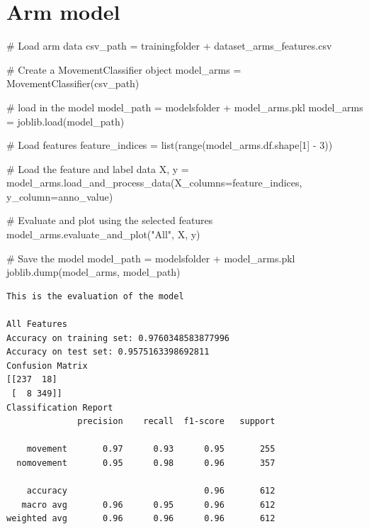 \documentclass[
  letterpaper,
  DIV=11,
  numbers=noendperiod]{scrreprt}
\newenvironment{Shaded}{\begin{snugshade}}{\end{snugshade}}
\newcommand{\BuiltInTok}[1]{\textcolor[rgb]{0.00,0.23,0.31}{#1}}
\newcommand{\CommentTok}[1]{\textcolor[rgb]{0.37,0.37,0.37}{#1}}
\newcommand{\DecValTok}[1]{\textcolor[rgb]{0.68,0.00,0.00}{#1}}
\newcommand{\NormalTok}[1]{\textcolor[rgb]{0.00,0.23,0.31}{#1}}
\newcommand{\OperatorTok}[1]{\textcolor[rgb]{0.37,0.37,0.37}{#1}}
\newcommand{\StringTok}[1]{\textcolor[rgb]{0.13,0.47,0.30}{#1}}
\begin{document}
\section{Arm model}\label{arm-model}

\begin{Shaded}
\begin{Highlighting}[]
\CommentTok{\# Load arm data}
\NormalTok{csv\_path }\OperatorTok{=}\NormalTok{ trainingfolder }\OperatorTok{+} \StringTok{\textquotesingle{}dataset\_arms\_features.csv\textquotesingle{}}

\CommentTok{\# Create a MovementClassifier object}
\NormalTok{model\_arms }\OperatorTok{=}\NormalTok{ MovementClassifier(csv\_path)}

\CommentTok{\# load in the model}
\NormalTok{model\_path }\OperatorTok{=}\NormalTok{ modelsfolder }\OperatorTok{+} \StringTok{\textquotesingle{}model\_arms.pkl\textquotesingle{}}
\NormalTok{model\_arms }\OperatorTok{=}\NormalTok{ joblib.load(model\_path)}

\CommentTok{\# Load features}
\NormalTok{feature\_indices }\OperatorTok{=} \BuiltInTok{list}\NormalTok{(}\BuiltInTok{range}\NormalTok{(model\_arms.df.shape[}\DecValTok{1}\NormalTok{] }\OperatorTok{{-}} \DecValTok{3}\NormalTok{))}

\CommentTok{\# Load the feature and label data}
\NormalTok{X, y }\OperatorTok{=}\NormalTok{ model\_arms.load\_and\_process\_data(X\_columns}\OperatorTok{=}\NormalTok{feature\_indices, y\_column}\OperatorTok{=}\StringTok{\textquotesingle{}anno\_value\textquotesingle{}}\NormalTok{)}

\CommentTok{\# Evaluate and plot using the selected features}
\NormalTok{model\_arms.evaluate\_and\_plot(}\StringTok{"All"}\NormalTok{, X, y)}

\CommentTok{\# Save the model}
\NormalTok{model\_path }\OperatorTok{=}\NormalTok{ modelsfolder }\OperatorTok{+} \StringTok{\textquotesingle{}model\_arms.pkl\textquotesingle{}}
\NormalTok{joblib.dump(model\_arms, model\_path)}
\end{Highlighting}
\end{Shaded}

\begin{verbatim}
This is the evaluation of the model

All Features
Accuracy on training set: 0.9760348583877996
Accuracy on test set: 0.9575163398692811
Confusion Matrix
[[237  18]
 [  8 349]]
Classification Report
              precision    recall  f1-score   support

    movement       0.97      0.93      0.95       255
  nomovement       0.95      0.98      0.96       357

    accuracy                           0.96       612
   macro avg       0.96      0.95      0.96       612
weighted avg       0.96      0.96      0.96       612
\end{verbatim}
\end{document}
